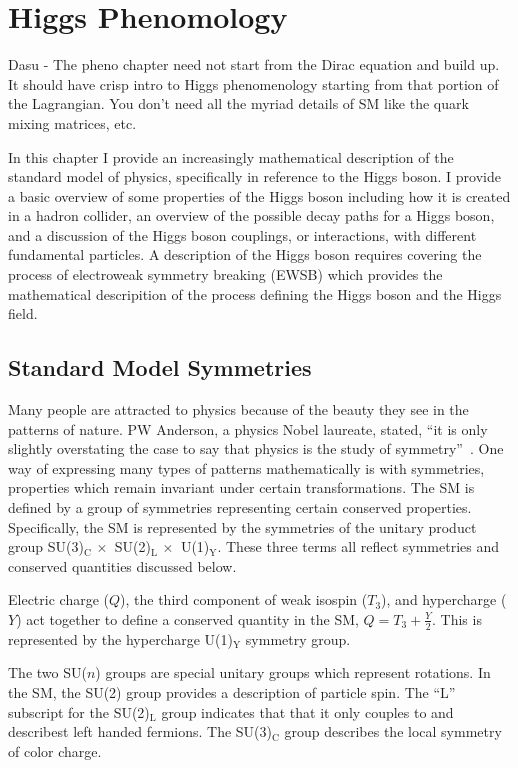 \chapter{Higgs Phenomology}
\label{sec:pheno}

Dasu -
The pheno chapter need not start from the Dirac equation and build up. It should have crisp intro to Higgs phenomenology starting from that portion of the Lagrangian. You don’t need all the myriad details of SM like the quark mixing matrices, etc.


In this chapter I provide an increasingly mathematical description of the standard model
of physics, specifically in reference to the Higgs boson. I provide a basic overview of some 
properties of the Higgs boson including how it is created in a hadron collider, an overview
of the possible decay paths for a Higgs boson, and a discussion of the Higgs boson
couplings, or interactions, with different fundamental particles. A description of the
Higgs boson requires covering the process of electroweak symmetry breaking (EWSB) which
provides the mathematical descripition of the process defining the Higgs boson and the
Higgs field.

\section{Standard Model Symmetries}
Many people are attracted to physics because of the beauty they see in the patterns of nature.
PW Anderson, a physics Nobel laureate, stated, ``it is only slightly overstating the case 
to say that physics is the study of symmetry''~\cite{pw_anderson:1972}.
One way of expressing many types of patterns mathematically is with symmetries, properties which 
remain invariant under certain transformations. The SM is defined by a group of symmetries
representing certain conserved properties. Specifically, the SM is represented by  the
symmetries of the unitary product group SU(3)$_{\text{C}} \,\times \,$ SU(2)$_{\text{L}} \, \times\,$ U(1)$_{\text{Y}}$.
These three terms all reflect symmetries and conserved quantities discussed below.

Electric charge ($Q$), the third component of weak isospin ($T_{3}$), and hypercharge ($Y$) act together to define a conserved 
quantity in the SM, $Q = T_{3} + \frac{Y}{2}$. This is represented by the
hypercharge U(1)$_{\text{Y}}$ symmetry group.

The two SU($n$) groups are special unitary groups which represent rotations.
In the SM, the SU(2) group provides a description of particle spin.
The ``L'' subscript for the SU(2)$_{\text{L}}$ group indicates that that it only couples to
and describest left handed fermions.
The SU(3)$_{\text{C}}$ group describes the local symmetry of color charge.


